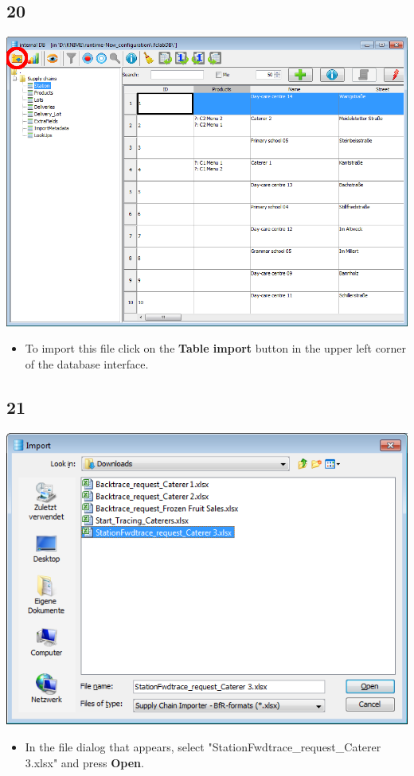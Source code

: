 \documentclass{beamer}
\begin{document}
\subsection{20}
\begin{frame}
	\begin{center}
  		\includegraphics[height=0.6\textheight]{20.png}
	\end{center}
	\begin{itemize}
		\item To import this file click on the \textbf{Table import} button in the upper left corner of the database interface.
	\end{itemize}
\end{frame}

\subsection{21}
\begin{frame}
	\begin{center}
  		\includegraphics[height=0.5\textheight]{21.png}
	\end{center}
	\begin{itemize}
		\item In the file dialog that appears, select "StationFwdtrace\_request\_Caterer 3.xlsx" and press \textbf{Open}.
	\end{itemize}
\end{frame}
\end{document}
